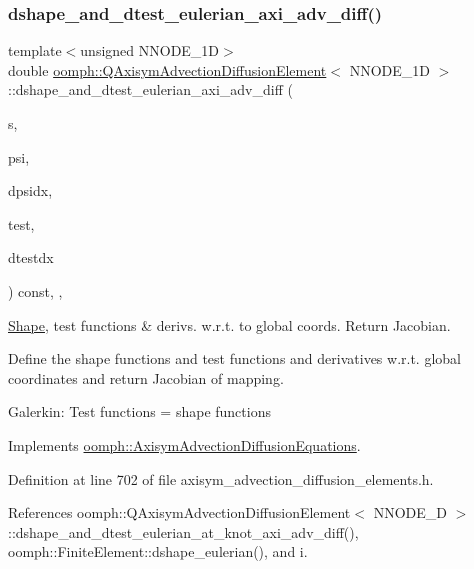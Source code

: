 \subsubsection{\texorpdfstring{dshape\+\_\+and\+\_\+dtest\+\_\+eulerian\+\_\+axi\+\_\+adv\+\_\+diff()}{dshape\_and\_dtest\_eulerian\_axi\_adv\_diff()}}
{\footnotesize\ttfamily template$<$unsigned N\+N\+O\+D\+E\+\_\+1D$>$ \\
double \hyperlink{classoomph_1_1QAxisymAdvectionDiffusionElement}{oomph\+::\+Q\+Axisym\+Advection\+Diffusion\+Element}$<$ N\+N\+O\+D\+E\+\_\+1D $>$\+::dshape\+\_\+and\+\_\+dtest\+\_\+eulerian\+\_\+axi\+\_\+adv\+\_\+diff (\begin{DoxyParamCaption}\item[{const \hyperlink{classoomph_1_1Vector}{Vector}$<$ double $>$ \&}]{s,  }\item[{\hyperlink{classoomph_1_1Shape}{Shape} \&}]{psi,  }\item[{\hyperlink{classoomph_1_1DShape}{D\+Shape} \&}]{dpsidx,  }\item[{\hyperlink{classoomph_1_1Shape}{Shape} \&}]{test,  }\item[{\hyperlink{classoomph_1_1DShape}{D\+Shape} \&}]{dtestdx }\end{DoxyParamCaption}) const\hspace{0.3cm}{\ttfamily [inline]}, {\ttfamily [protected]}, {\ttfamily [virtual]}}



\hyperlink{classoomph_1_1Shape}{Shape}, test functions \& derivs. w.\+r.\+t. to global coords. Return Jacobian. 

Define the shape functions and test functions and derivatives w.\+r.\+t. global coordinates and return Jacobian of mapping.

Galerkin\+: Test functions = shape functions 

Implements \hyperlink{classoomph_1_1AxisymAdvectionDiffusionEquations_a92b918f392733e6128e192c2fbdb478c}{oomph\+::\+Axisym\+Advection\+Diffusion\+Equations}.



Definition at line 702 of file axisym\+\_\+advection\+\_\+diffusion\+\_\+elements.\+h.



References oomph\+::\+Q\+Axisym\+Advection\+Diffusion\+Element$<$ N\+N\+O\+D\+E\+\_\+D $>$\+::dshape\+\_\+and\+\_\+dtest\+\_\+eulerian\+\_\+at\+\_\+knot\+\_\+axi\+\_\+adv\+\_\+diff(), oomph\+::\+Finite\+Element\+::dshape\+\_\+eulerian(), and i.




